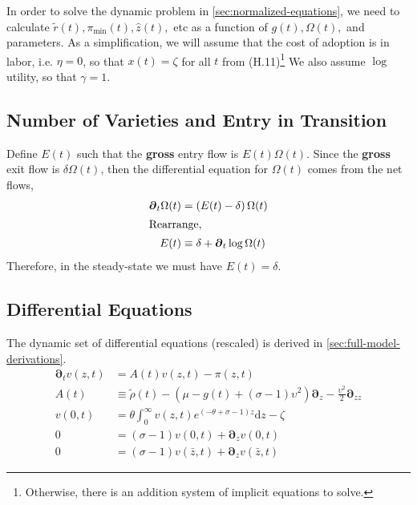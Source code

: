 \documentclass[11pt]{article}
\newcommand{\D}[1][]{\ensuremath{\boldsymbol{\partial}_{#1}}}
\newcommand{\diff}{\ensuremath{\mathrm{d}}}
\begin{document}
In order to solve the dynamic problem in \cref{sec:normalized-equations}, we need to calculate $\tilde{r}(t), \pi_{\min}(t),\hat{z}(t),$ etc  as a function of $g(t), \Omega(t),$ and parameters.  As a simplification, we will assume that the cost of adoption is in labor, i.e. $\eta = 0$, so that $x(t) = \zeta$ for all $t$ from (H.11)\footnote{Otherwise, there is an addition system of implicit equations to solve.}  We also assume $\log$ utility, so that $\gamma = 1$.

\subsection{Number of Varieties and Entry in Transition}

Define $E(t)$ such that the \textbf{gross} entry flow is $E(t)\Omega(t)$.  Since the \textbf{gross} exit flow is $\delta \Omega(t)$, then the differential equation for $\Omega(t)$ comes from the net flows,
\begin{align}
	\D[t] \Omega(t) &= \left(E(t) - \delta \right)\Omega(t)\\
\intertext{Rearrange,}
E(t) &\equiv \delta + \D[t]\log \Omega(t)
\end{align}	
Therefore, in the steady-state we must have $E(t) = \delta$.

\subsection{Differential Equations}\label{sec:full-ODE}
The dynamic set of differential equations (rescaled) is derived in \cref{sec:full-model-derivations}.
\begin{align}
	\D[t]v(z,t) &= A(t)v(z,t) - \pi(z,t) \\	
	A(t) &\equiv \tilde{\rho}(t)  - (\mu - g(t) + (\sigma - 1)\upsilon^2)\D[z] - \frac{\upsilon^2}{2}\D[zz]\\
	v(0,t) &= \theta \int_{0}^{\infty}v(z,t) e^{(-\theta + \sigma - 1)z} \diff z - \zeta\label{eq:normalized-vm-summary-rescaled}\\
	0 &= (\sigma - 1)v(0,t) + \D[z]v(0,t)\label{eq:normalized-sp-summary-rescaled}\\
	0 &= (\sigma - 1)v(\bar{z},t) + \D[z]v(\bar{z},t)\label{eq:normalized-rhs-summary-rescaled}
\end{align}
\end{document}

